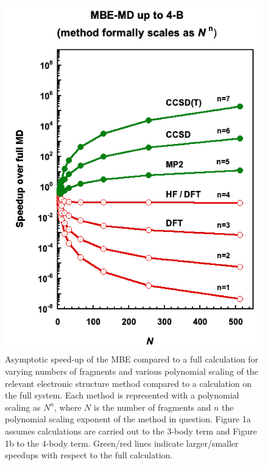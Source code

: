 \begin{figure}[t]
\begin{center}
\begin{minipage}{0.4\textwidth}
\includegraphics[width=\textwidth]{Figures/Chapter_4/ch4_figure_1_right.png}
\end{minipage}
\end{center}
\begin{spacing}{1.0}
\caption[Asymptotic speed-up of the MBE compared to a full calculation for varying numbers of fragments and various polynomial scaling of the relevant electronic structure method compared to a calculation on the full system. Each method is represented with a polynomial scaling as $N^n$, where $N$ is the number of fragments and $n$ the polynomial scaling exponent of the method in question.]{Asymptotic speed-up of the MBE compared to a full calculation for varying numbers of fragments and various polynomial scaling of the relevant electronic structure method compared to a calculation on the full system. Each method is represented with a polynomial scaling as $N^n$, where $N$ is the number of fragments and $n$ the polynomial scaling exponent of the method in question. Figure 1a assumes calculations are carried out to the 3-body term and Figure 1b to the 4-body term. Green/red lines indicate larger/smaller speedups with respect to the full calculation.}\label{fig:MBE_MD_F1_intro}
\end{spacing}
\end{figure}